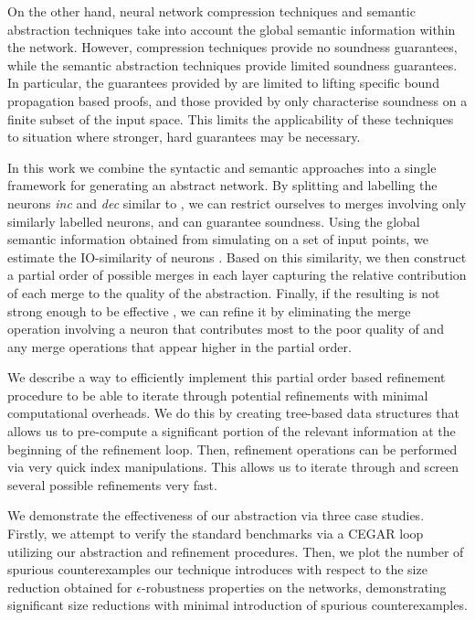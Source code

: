 On the other hand, neural network compression techniques  and
semantic abstraction techniques \cite{deep-abstract, lin-comb-abs-jan} take into
account the global semantic information within the network. However,
compression techniques provide no soundness guarantees, while the semantic
abstraction techniques provide limited soundness guarantees. In particular, the
guarantees provided by \cite{deep-abstract} are limited to lifting specific
bound propagation based proofs, and those provided by \cite{lin-comb-abs-jan}
only characterise soundness on a finite subset of the input space. This limits the applicability
of these techniques to situation where stronger, hard guarantees may be
necessary.

In this work we combine the syntactic and semantic approaches into a single
framework for generating an abstract network. By splitting and labelling the
neurons \textit{inc} and \textit{dec} similar to \cite{cegar-nn}, we can
restrict ourselves to merges involving only similarly labelled neurons, and can
guarantee soundness. Using the global semantic information obtained from
simulating \cnc on a set of input points, we estimate the IO-similarity of
neurons . Based on this
similarity, we then construct a partial order of possible merges in each layer
capturing the relative contribution of each merge to the quality of the
abstraction. Finally, if the resulting \abs
is not strong enough to be effective , we can refine it by eliminating the merge operation involving
a neuron that contributes most to the poor quality  of \abs and any merge operations that appear higher in the partial
order.

We describe a way to efficiently implement this partial order based refinement
procedure to be able to iterate through potential refinements with minimal
computational overheads. We do this by creating tree-based data structures that
allows us to pre-compute a significant portion of the relevant information at
the beginning of the refinement loop. Then, refinement operations can be
performed via very quick index manipulations. This allows us to iterate through
and screen several possible refinements very fast. 

We demonstrate the effectiveness of our abstraction via three case studies.
Firstly, we attempt to verify the standard \acasxu benchmarks via a CEGAR loop
utilizing our abstraction and refinement procedures.  Then, we plot the number of spurious counterexamples our technique
introduces with respect to the size reduction obtained for $\epsilon$-robustness
properties on the \mnist networks, demonstrating significant size reductions
with minimal introduction of spurious counterexamples. 


